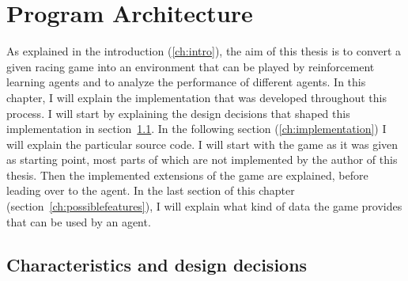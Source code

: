 \chapter{Program Architecture}

\label{ch:program}

\newcommand{\term}[1] {{\spaceskip=.95\fontdimen2\font minus \fontdimen4\font
	\xspaceskip=0pt\relax \large\texttt{#1}}}

\renewcommand{\inlinecode}[1]{\colorbox{red}{\lstinline[basicstyle=\ttfamily\color{black}]{#1}}}


\newcommand{\codefunc}[1]{\colorbox{evenmorelightgray}{\lstinline[basicstyle=\ttfamily\color{black},keywordstyle=\ttfamily]{#1}}}

\newcommand{\codeobj}[1]{\colorbox{evenmorelightgray}{{\spaceskip=.95\fontdimen2\font minus \fontdimen4\font	\xspaceskip=0pt\relax \large\texttt{#1}}}}

\newcommand{\codeother}[1]{\colorbox{evenmorelightgray}{\lstinline[basicstyle=\ttfamily\color{black}]{#1}}}


\newcommand{\filename}[1] {{\spaceskip=.95\fontdimen2\font minus \fontdimen4\font
		\xspaceskip=0pt\relax \large\texttt{#1}}}


As explained in the introduction (\ref{ch:intro}), the aim of this thesis is to convert a given racing game into an environment that can be played by reinforcement learning agents and to analyze the performance of different agents. In this chapter, I will explain the implementation that was developed throughout this process. I will start by explaining the design decisions that shaped this implementation in section~\ref{ch:projectcharacteristicschap}. In the following section (\ref{ch:implementation}) I will explain the particular source code. I will start with the game as it was given as starting point, most parts of which are not implemented by the author of this thesis. Then the implemented extensions of the game are explained, before leading over to the agent. In the last section of this chapter (section~\ref{ch:possiblefeatures}), I will explain what kind of data the game provides that can be used by an agent.

\section{Characteristics and design decisions}

\label{ch:projectcharacteristicschap}

